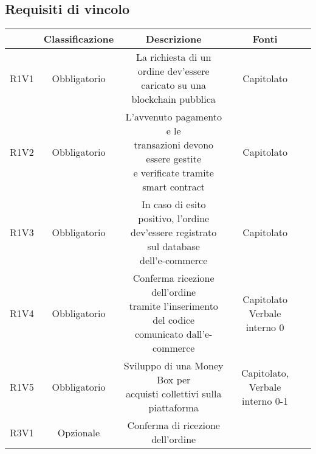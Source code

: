\subsection{Requisiti di vincolo}
\begin{center}
	\renewcommand{\arraystretch}{1.8}
	\begin{longtable}[c]{c | c | c | c | p{5cm}}
		\rowcolor[HTML]{125E28}
		\multicolumn{1}{c}{\color[HTML]{FFFFFF} \textbf{Codice}} & 
		\multicolumn{1}{c}{\color[HTML]{FFFFFF} \textbf{Classificazione}} & 
		\multicolumn{1}{c}{\color[HTML]{FFFFFF} \textbf{Descrizione}} & 
		\multicolumn{1}{c}{\color[HTML]{FFFFFF} \textbf{Fonti}} \\
		\endhead
		R1V1 & Obbligatorio & \shortstack{La richiesta di un ordine dev'essere \\
                                        caricato su una blockchain pubblica} & Capitolato \\
        R1V2 & Obbligatorio & \shortstack{L'avvenuto pagamento e le \\
                                        transazioni devono essere  
                                        gestite \\ e verificate tramite 
                                        smart contract} & Capitolato \\
        R1V3 & Obbligatorio & \shortstack{In caso di esito positivo, l'ordine\\
                                        dev'essere registrato sul database \\
                                        dell'e-commerce} & Capitolato \\
        R1V4 & Obbligatorio & \shortstack{Conferma ricezione dell'ordine \\
                                        tramite l'inserimento del codice \\
                                        comunicato dall'e-commerce} & \shortstack{Capitolato \\ Verbale interno 0} \\
        R1V5 & Obbligatorio & \shortstack{Sviluppo di una Money Box per \\
                                        acquisti collettivi sulla piattaforma} & \shortstack{Capitolato, \\ Verbale interno 0-1} \\
        R3V1 & Opzionale & \shortstack{Conferma di ricezione dell'ordine \\
}
\end{longtable}
\end{center}

